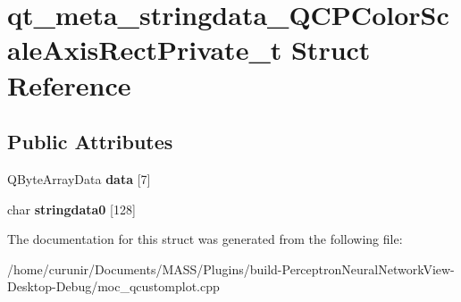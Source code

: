\hypertarget{structqt__meta__stringdata___q_c_p_color_scale_axis_rect_private__t}{}\section{qt\+\_\+meta\+\_\+stringdata\+\_\+\+Q\+C\+P\+Color\+Scale\+Axis\+Rect\+Private\+\_\+t Struct Reference}
\label{structqt__meta__stringdata___q_c_p_color_scale_axis_rect_private__t}
\subsection*{Public Attributes}
\begin{DoxyCompactItemize}
\item 
Q\+Byte\+Array\+Data {\bfseries data} \mbox{[}7\mbox{]}\hypertarget{structqt__meta__stringdata___q_c_p_color_scale_axis_rect_private__t_ad6a4e6859b02e86ad4cab1b35d1a9e24}{}\label{structqt__meta__stringdata___q_c_p_color_scale_axis_rect_private__t_ad6a4e6859b02e86ad4cab1b35d1a9e24}

\item 
char {\bfseries stringdata0} \mbox{[}128\mbox{]}\hypertarget{structqt__meta__stringdata___q_c_p_color_scale_axis_rect_private__t_ab4bf0dacc0cccfabffae8da79f9f5f46}{}\label{structqt__meta__stringdata___q_c_p_color_scale_axis_rect_private__t_ab4bf0dacc0cccfabffae8da79f9f5f46}

\end{DoxyCompactItemize}


The documentation for this struct was generated from the following file\+:\begin{DoxyCompactItemize}
\item 
/home/curunir/\+Documents/\+M\+A\+S\+S/\+Plugins/build-\/\+Perceptron\+Neural\+Network\+View-\/\+Desktop-\/\+Debug/moc\+\_\+qcustomplot.\+cpp\end{DoxyCompactItemize}
